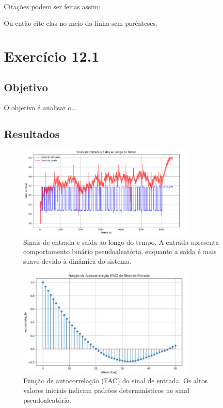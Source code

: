 \documentclass[12pt,a4paper]{article}
\begin{document}
Citações podem ser feitas assim: \cite{Verdoold2014}

Ou então cite elas no meio da linha 
sem parênteses.

\section{Exercício 12.1}

\subsection{Objetivo}
O objetivo é analisar o...

\subsection{Resultados}

\begin{figure}[h]
\centering
\includegraphics[width=0.8\textwidth]{12_1_1.png}
\caption{Sinais de entrada e saída ao longo do tempo. A entrada apresenta comportamento binário pseudoaleatório, enquanto a saída é mais suave devido à dinâmica do sistema.}
\label{fig:signals}
\end{figure}

\begin{figure}[h]
\centering
\includegraphics[width=0.8\textwidth]{12_1_2.png}
\caption{Função de autocorrelação (FAC) do sinal de entrada. Os altos valores iniciais indicam padrões determinísticos no sinal pseudoaleatório.}
\label{fig:autocorr}
\end{figure}
\end{document}
